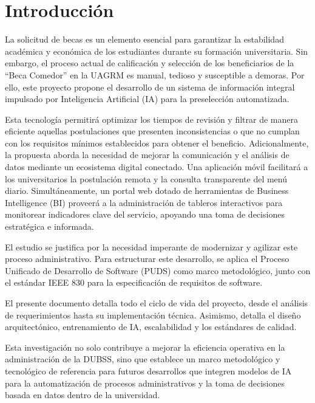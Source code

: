 
\section{Introducción}\label{sec:introduccion}

La solicitud de becas es un elemento esencial para garantizar la estabilidad académica y económica de los estudiantes durante su formación universitaria. Sin embargo, el proceso actual de calificación y selección de los beneficiarios de la \enquote{Beca Comedor} en la UAGRM es manual, tedioso y susceptible a demoras. Por ello, este proyecto propone el desarrollo de un sistema de información integral impulsado por Inteligencia Artificial (IA) para la preselección automatizada.

Esta tecnología permitirá optimizar los tiempos de revisión y filtrar de manera eficiente aquellas postulaciones que presenten inconsistencias o que no cumplan con los requisitos mínimos establecidos para obtener el beneficio. Adicionalmente, la propuesta aborda la necesidad de mejorar la comunicación y el análisis de datos mediante un ecosistema digital conectado. Una aplicación móvil facilitará a los universitarios la postulación remota y la consulta transparente del menú diario. Simultáneamente, un portal web dotado de herramientas de Business Intelligence (BI) proveerá a la administración de tableros interactivos para monitorear indicadores clave del servicio, apoyando una toma de decisiones estratégica e informada.

El estudio se justifica por la necesidad imperante de modernizar y agilizar este proceso administrativo. Para estructurar este desarrollo, se aplica el Proceso Unificado de Desarrollo de Software (PUDS) como marco metodológico, junto con el estándar IEEE 830 para la especificación de requisitos de software.

El presente documento detalla todo el ciclo de vida del proyecto, desde el análisis de requerimientos hasta su implementación técnica. Asimismo, detalla el diseño arquitectónico, entrenamiento de IA, escalabilidad y los estándares de calidad.

Esta investigación no solo contribuye a mejorar la eficiencia operativa en la administración de la DUBSS, sino que establece un marco metodológico y tecnológico de referencia para futuros desarrollos que integren modelos de IA para la automatización de procesos administrativos y la toma de decisiones basada en datos dentro de la universidad.